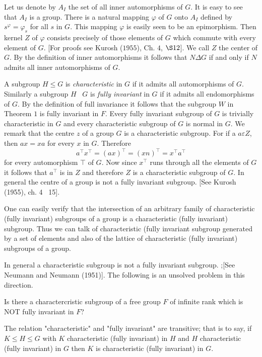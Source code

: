  Let us denote by $A_I$ the set of all inner automorphisms of $G$. It
 is easy to see that $A_I$ is a group. There is a natural mapping
 $\varphi$ of $G$ onto $A_I$ defined by $s^\varphi = \varphi_s$ for
 all $s$ in $G$. This mapping $\varphi$ is easily seen to be an
 epimorphism. Then kernel $Z$ of $\varphi$ consists precisely of those
 elements of $G$ which commute with every element of $G$. [For proofs
   see Kurosh ($1955$), Ch. $4$, $\S 12$]. We call $Z$ the center of
 $G$. By the definition of inner automorphisms it follows that $N
 \Delta G$ if and only if $N$ admits all inner automorphisms of $G$. 
 
A subgroup $H \leq G$ is \textit{characteristic} in $G$ if it admits
all automorphisms of $G$. Similarly a subgroup $H$ ~$G$ is
\textit{fully invariant} in $G$ if it admits all endomorphisms of
$G$. By the definition of full invariance it follows that the subgroup
$W$ in Theorem $1$ is fully invariant in $F$. Every fully invariant
subgroup of $G$ is trivially characteristic in $G$ and every
characteristic subgroup of $G$ is normal in $G$. We remark that the
centre $z$ of a group $G$ is a characteristic subgroup. For if a $a
\varepsilon Z$, then $ax = xa$ for every $x$ in $G$. Therefore 
$$
a^\top x^\top = (ax)^\top = (xn)^\top = x^\top a^\top
$$
for every automorphism $\top$ of $G$. Now since $x^\top$ runs through
all the elements of $G$ it follows that $a^\top$ is in $Z$ and
therefore $Z$ is a characteristic subgroup of $G$. In general the
centre of a group is not a fully invariant subgroup. [See Kurosh
(1955), ch. 4 ~15]. 
 
One can easily verify that the intersection of an arbitrary family of
characteristic (fully invariant) subgroups of a group is a
characteristic (fully invariant) subgroup. Thus we can talk of
characteristic (fully invariant subgroup generated by a set of
elements and also of the lattice of characteristic (fully invariant)
subgroups of a group. 
 
In general a characteristic subgroup is not a fully invariant
subgroup. ;[See Neumann and Neumann (1951)]. The following is an
unsolved problem in this direction. 
 
\begin{unsolved problem}
  Is there a charactercristic subgroup of a free group $F$ of infinite
  rank which is NOT fully invariant in $F$? 
\end{unsolved problem} 
 
\begin{Theorem}
  The relation "characteristic" and "fully invariant" are transitive;
  that is to say, if $K \leq H \leq G$ with $K$ characteristic (fully
  invariant) in $H$ and $H$ characteristic (fully invariant) in $G$
  then $K$ is characteristic (fully invariant) in $G$. 
\end{Theorem} 
 
